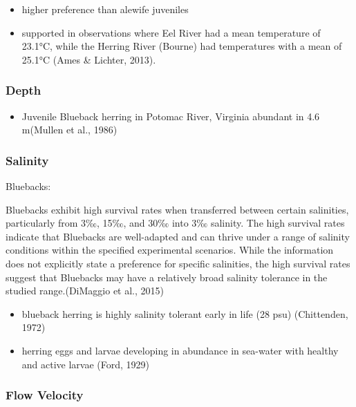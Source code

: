 \documentclass[
]{book}
\providecommand{\tightlist}{%
  \setlength{\itemsep}{0pt}\setlength{\parskip}{0pt}}
\begin{document}
\begin{itemize}
\item
  higher preference than alewife juveniles
\item
  supported in observations where Eel River had a mean temperature of 23.1°C, while the Herring River (Bourne) had temperatures with a mean of 25.1°C (Ames \& Lichter, 2013).
\end{itemize}

\hypertarget{depth-4}{%
\subsubsection{Depth}\label{depth-4}}

\begin{itemize}
\tightlist
\item
  Juvenile Blueback herring in Potomac River, Virginia abundant in 4.6 m(Mullen et al., 1986)
\end{itemize}

\hypertarget{salinity-4}{%
\subsubsection{Salinity}\label{salinity-4}}

Bluebacks:

Bluebacks exhibit high survival rates when transferred between certain salinities, particularly from 3‰, 15‰, and 30‰ into 3‰ salinity.
The high survival rates indicate that Bluebacks are well-adapted and can thrive under a range of salinity conditions within the specified experimental scenarios.
While the information does not explicitly state a preference for specific salinities, the high survival rates suggest that Bluebacks may have a relatively broad salinity tolerance in the studied range.(DiMaggio et al., 2015)

\begin{itemize}
\tightlist
\item
  blueback herring is highly salinity tolerant early in life (28 psu) (Chittenden, 1972)
\item
  herring eggs and larvae developing in abundance in sea-water with healthy and active larvae (Ford, 1929)
\end{itemize}

\hypertarget{flow-velocity-4}{%
\subsubsection{Flow Velocity}\label{flow-velocity-4}}
\end{document}
